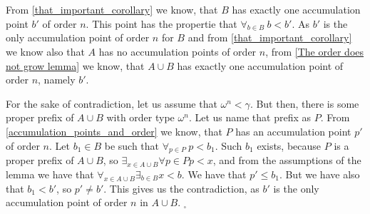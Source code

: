 From \ref{that_important_corollary} we know, that $B$ has exactly one accumulation point $b'$ of 
order $n$. This point has the propertie that $\forall_{b\in B}\ b<b'$.
As $b'$ is the only accumulation point of 
order $n$ for $B$ and from \ref{that_important_corollary} we know also that 
$A$ has no accumulation points of order $n$, from \ref{The order does not grow lemma} we know, 
that $A\cup B$ has exactly one accumulation point of order $n$, namely $b'$. 


For the sake of contradiction, let us assume that $\omega^n < \gamma$. But then, 
there is some proper prefix of $A\cup B$ with order type $\omega^n$. Let us name that 
prefix as $P$. From \ref{accumulation_points_and_order} we know, that 
$P$ has an accumulation point $p'$ of order $n$. 
Let $b_1 \in B$ be such that $\forall_{p \in P}\ p<b_1$. Such $b_1$ exists, because $P$ is 
a proper prefix of $A\cup B$, so $\exists_{x\in A\cup B}\forall{p\in P} p < x$, and 
from the assumptions of the lemma we have that 
$\forall_{x \in A\cup B}\exists_{b \in B} x < b$.
We have that $p' \leq b_1$. But we have also that $b_1 < b'$, so $p' \neq b'$. This gives us the 
contradiction, as $b'$ is the only accumulation point of order $n$ in $A\cup B$. $_\square$






